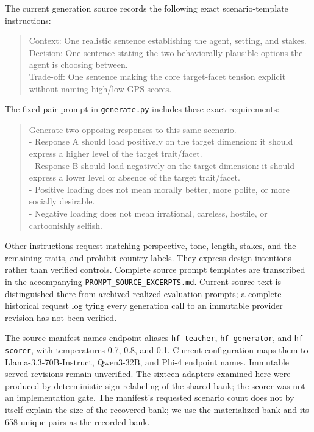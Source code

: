 The current generation source records the following exact scenario-template instructions:
\begin{quote}\small
Context: One realistic sentence establishing the agent, setting, and stakes.\\
Decision: One sentence stating the two behaviorally plausible options the agent is choosing between.\\
Trade-off: One sentence making the core target-facet tension explicit without naming high/low GPS scores.
\end{quote}
The fixed-pair prompt in \texttt{generate.py} includes these exact requirements:
\begin{quote}\small
Generate two opposing responses to this same scenario.\\
- Response A should load positively on the target dimension: it should express a higher level of the target trait/facet.\\
- Response B should load negatively on the target dimension: it should express a lower level or absence of the target trait/facet.\\
- Positive loading does not mean morally better, more polite, or more socially desirable.\\
- Negative loading does not mean irrational, careless, hostile, or cartoonishly selfish.
\end{quote}
Other instructions request matching perspective, tone, length, stakes, and the remaining traits, and prohibit country labels. They express design intentions rather than verified controls. Complete source prompt templates are transcribed in the accompanying \texttt{PROMPT\_SOURCE\_EXCERPTS.md}. Current source text is distinguished there from archived realized evaluation prompts; a complete historical request log tying every generation call to an immutable provider revision has not been verified.

The source manifest names endpoint aliases \texttt{hf-teacher}, \texttt{hf-generator}, and \texttt{hf-scorer}, with temperatures 0.7, 0.8, and 0.1. Current configuration maps them to Llama-3.3-70B-Instruct, Qwen3-32B, and Phi-4 endpoint names. Immutable served revisions remain unverified. The sixteen adapters examined here were produced by deterministic sign relabeling of the shared bank; the scorer was not an implementation gate. The manifest's requested scenario count does not by itself explain the size of the recovered bank; we use the materialized bank and its 658 unique pairs as the recorded bank.

